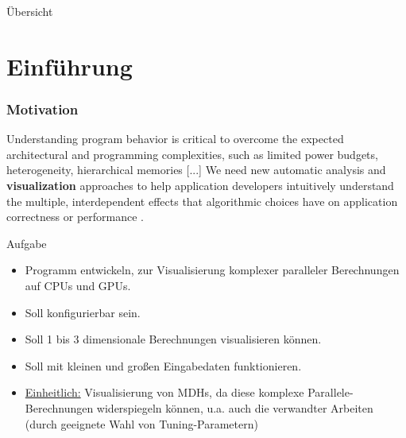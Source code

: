 \documentclass{presentation}
\begin{document}
\begin{frame}
    \titlepage
\end{frame}

\begin{frame}{Übersicht}
    \tableofcontents
\end{frame}

\section{Einführung}

\begin{frame}[allowframebreaks]
	\frametitle{Motivation}
	Understanding program behavior is critical to overcome the expected architectural and programming complexities, such as limited power budgets, heterogeneity, hierarchical memories [...] We need new automatic analysis and \textbf{visualization} approaches to help application developers intuitively understand the multiple, interdependent effects that algorithmic choices have on application correctness or performance \cite{protools20}.
	
	
\end{frame}

\begin{frame}{Aufgabe}
    \begin{itemize}
        \item Programm entwickeln, zur Visualisierung komplexer paralleler Berechnungen auf CPUs und GPUs.
        \item Soll konfigurierbar sein.
        \item Soll 1 bis 3 dimensionale Berechnungen visualisieren können.
        \item Soll mit kleinen und großen Eingabedaten funktionieren.
        \item \underline{Einheitlich:} Visualisierung von MDHs, da diese komplexe Parallele-Berechnungen widerspiegeln können, u.a. auch die verwandter Arbeiten (durch geeignete Wahl von Tuning-Parametern)
    \end{itemize}
\end{frame}
\end{document}

